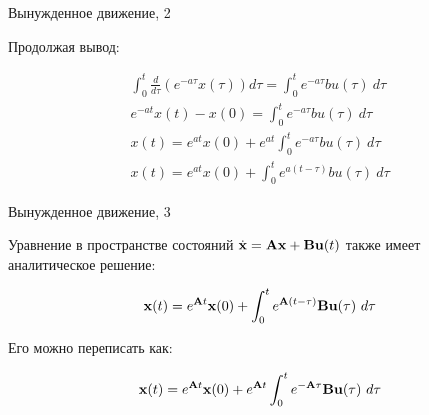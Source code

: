 \documentclass{beamer}
\begin{document}
\begin{frame}{Вынужденное движение, 2}
	\begin{flushleft}
		
		Продолжая вывод:
		
		\begin{align}
			\int_{0}^{t} \frac{d}{d\tau} \left( e^{-a\tau} x(\tau) \right) d\tau = 	\int_{0}^{t}  e^{-a\tau} bu(\tau) \ d\tau
			\\
			e^{-at} x(t) - x(0) = \int_{0}^{t}  e^{-a\tau} bu(\tau) \ d\tau
			\\
			x(t) = e^{at} x(0) + e^{at} \int_{0}^{t}  e^{-a\tau} bu(\tau) \ d\tau
			\\
			x(t) = e^{at} x(0) + \int_{0}^{t}  e^{a(t-\tau)} bu(\tau) \ d\tau
		\end{align}
		
	\end{flushleft}
\end{frame}

\begin{frame}{Вынужденное движение, 3}
	\begin{flushleft}
		
		Уравнение в пространстве состояний $\dot{\mathbf{x}} = \mathbf{A}  \mathbf{x} + \mathbf{B}  \mathbf{u}(t)$ также имеет аналитическое решение:
		
		\begin{equation}
			\bo{x}(t) = e^{\bo{A}t}  \bo{x}(0) + 
			\int_{0}^{t} e^{\bo{A}(t-\tau)} \bo{B}  \bo{u}(\tau) \ d\tau
		\end{equation}
		
		Его можно переписать как:
		
		\begin{equation}
			\mathbf{x}(t) = e^{\mathbf{A}t}  \mathbf{x}(0) + 
			e^{\mathbf{A}t} \int_{0}^{t} e^{-\mathbf{A}\tau} \mathbf{B}  \mathbf{u}(\tau) \ d\tau
		\end{equation}
		
	\end{flushleft}
\end{frame}

\begin{frame}
	
	
\end{frame}
\end{document}
